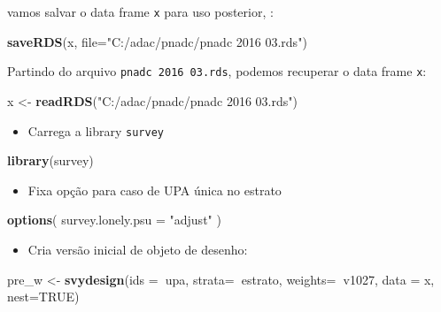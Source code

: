 \documentclass[]{book}
\newenvironment{Shaded}{\begin{snugshade}}{\end{snugshade}}
\newcommand{\KeywordTok}[1]{\textcolor[rgb]{0.13,0.29,0.53}{\textbf{#1}}}
\newcommand{\DataTypeTok}[1]{\textcolor[rgb]{0.13,0.29,0.53}{#1}}
\newcommand{\StringTok}[1]{\textcolor[rgb]{0.31,0.60,0.02}{#1}}
\newcommand{\OtherTok}[1]{\textcolor[rgb]{0.56,0.35,0.01}{#1}}
\newcommand{\OperatorTok}[1]{\textcolor[rgb]{0.81,0.36,0.00}{\textbf{#1}}}
\newcommand{\NormalTok}[1]{#1}
\providecommand{\tightlist}{%
  \setlength{\itemsep}{0pt}\setlength{\parskip}{0pt}}
\theoremstyle{definition}
\theoremstyle{definition}
\theoremstyle{definition}
\theoremstyle{remark}
\begin{document}
vamos salvar o data frame \texttt{x} para uso posterior, :

\begin{Shaded}
\begin{Highlighting}[]
\KeywordTok{saveRDS}\NormalTok{(x, }\DataTypeTok{file=}\StringTok{"C:/adac/pnadc/pnadc 2016 03.rds"}\NormalTok{)}
\end{Highlighting}
\end{Shaded}

Partindo do arquivo \texttt{pnadc\ 2016\ 03.rds}, podemos recuperar o
data frame \texttt{x}:

\begin{Shaded}
\begin{Highlighting}[]
\NormalTok{x <-}\StringTok{ }\KeywordTok{readRDS}\NormalTok{(}\StringTok{"C:/adac/pnadc/pnadc 2016 03.rds"}\NormalTok{)}
\end{Highlighting}
\end{Shaded}

\begin{itemize}
\tightlist
\item
  Carrega a library \texttt{survey}
\end{itemize}

\begin{Shaded}
\begin{Highlighting}[]
\KeywordTok{library}\NormalTok{(survey)}
\end{Highlighting}
\end{Shaded}

\begin{itemize}
\tightlist
\item
  Fixa opção para caso de UPA única no estrato
\end{itemize}

\begin{Shaded}
\begin{Highlighting}[]
\KeywordTok{options}\NormalTok{( }\DataTypeTok{survey.lonely.psu =} \StringTok{"adjust"}\NormalTok{ )}
\end{Highlighting}
\end{Shaded}

\begin{itemize}
\tightlist
\item
  Cria versão inicial de objeto de desenho:
\end{itemize}

\begin{Shaded}
\begin{Highlighting}[]
\NormalTok{pre_w <-}\StringTok{ }\KeywordTok{svydesign}\NormalTok{(}\DataTypeTok{ids =}\OperatorTok{~}\NormalTok{upa, }\DataTypeTok{strata=}\OperatorTok{~}\NormalTok{estrato, }
  \DataTypeTok{weights=}\OperatorTok{~}\NormalTok{v1027, }\DataTypeTok{data =}\NormalTok{ x, }\DataTypeTok{nest=}\OtherTok{TRUE}\NormalTok{)}
\end{Highlighting}
\end{Shaded}
\end{document}
